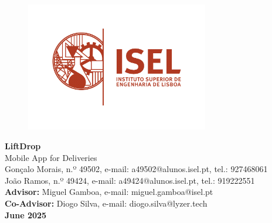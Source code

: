 \documentclass[a4paper,twoside,11pt]{article}
\begin{document}
\begin{titlepage}
    \thispagestyle{empty}
    \vspace{-15mm}
    \begin{figure}[h]
        \centering
        \includegraphics[width=80mm]{images/logoISEL.png}
    \end{figure}
    \vspace{-8mm}
    \begin{center}
        \LARGE \textbf{LiftDrop} \\
        \LARGE Mobile App for Deliveries \\[2cm]

        \large Gonçalo Morais, n.º 49502, e-mail: a49502@alunos.isel.pt, tel.: 927468061 \\
        \vspace{1mm}
        \large João Ramos, n.º 49424, e-mail: a49424@alunos.isel.pt, tel.: 919222551 \\[5mm]

        \large \textbf{Advisor:} Miguel Gamboa, e-mail: miguel.gamboa@isel.pt \\
        \large \textbf{Co-Advisor:} Diogo Silva, e-mail: diogo.silva@lyzer.tech \\[1cm]

        \textbf{June 2025}
    \end{center}
\end{titlepage}

\newpage
\thispagestyle{empty}
\null
\newpage

\setcounter{page}{1}
\end{document}

